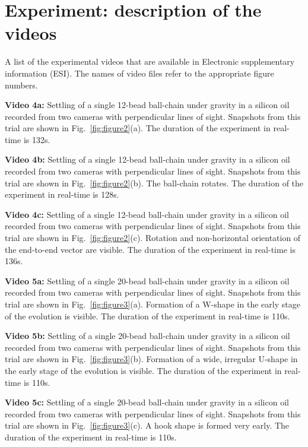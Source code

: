 \documentclass{article}
\begin{document}
\section{Experiment: description of the videos}

A list of the experimental videos that are available in Electronic supplementary information (ESI)\dag{}. The names of video files refer to the appropriate figure numbers.




\textbf{Video 4a:}
Settling of a single 12-bead ball-chain under gravity in a silicon oil recorded from two cameras with perpendicular lines of sight. Snapshots from this trial are shown in 
Fig.~\ref{fig:figure2}(a). %
The duration of the experiment in real-time is 132s.

\textbf{Video 4b:}
Settling of a single 12-bead ball-chain under gravity in a silicon  oil recorded from two cameras with perpendicular lines of sight. Snapshots from this trial are shown in 
Fig.~\ref{fig:figure2}(b). The ball-chain rotates. 
The duration of the experiment in real-time is 128s.

\textbf{Video 4c:}
Settling of a single 12-bead ball-chain under gravity in a silicon  oil recorded from two cameras with perpendicular lines of sight. Snapshots from this trial are shown in 
Fig.~\ref{fig:figure2}(c).
Rotation and non-horizontal orientation of the end-to-end vector are visible. %
The duration of the experiment in real-time is 136s.

\textbf{Video 5a:}
Settling of a single 20-bead ball-chain under gravity in a silicon  oil recorded from two cameras with perpendicular lines of sight. Snapshots from this trial are shown in 
Fig.~\ref{fig:figure3}(a). Formation of a  W-shape in the early stage of the evolution is visible.
The duration of the experiment in real-time is 110s.

\textbf{Video 5b:}
Settling of a single 20-bead ball-chain under gravity in a silicon  oil recorded from two cameras with perpendicular lines of sight.  Snapshots from this trial are shown in 
Fig.~\ref{fig:figure3}(b).
Formation of a wide, irregular U-shape in the early stage of the evolution is visible.
The duration of the experiment in real-time is 110s.

\textbf{Video 5c:}
Settling of a single 20-bead ball-chain under gravity in a silicon oil recorded from two cameras with perpendicular lines of sight.  Snapshots from this trial are shown in 
Fig.~\ref{fig:figure3}(c). A hook shape is formed very early. 
The duration of the experiment in real-time is 110s.
\end{document}
